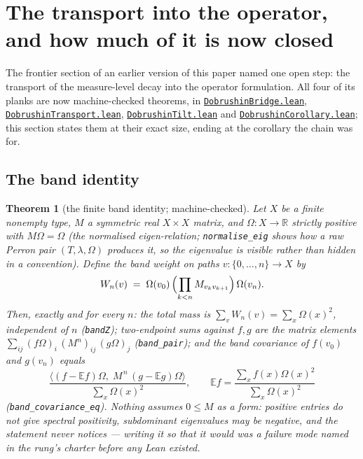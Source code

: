 \documentclass[11pt]{article}
\newtheorem{theorem}{Theorem}[section]
\theoremstyle{definition}
\newcommand{\anchor}{c7b870b05bd6d1bec270d499e1358a64070ce0e1}
\newcommand{\repofile}[2]{%
  \href{https://github.com/lluiseriksson/THE-ERIKSSON-PROGRAMME/blob/\anchor/#1}{\nolinkurl{#2}}}
\newcommand{\R}{\mathbb{R}}
\begin{document}
\section{The transport into the operator, and how much of it is now
closed}
\label{sec:transport}

The frontier section of an earlier version of this paper named one open
step: the transport of the measure-level decay into the operator
formulation.  All four of its planks are now machine-checked theorems, in
\repofile{YangMills/OS/DobrushinBridge.lean}{DobrushinBridge.lean},
\repofile{YangMills/OS/DobrushinTransport.lean}{DobrushinTransport.lean},
\repofile{YangMills/OS/DobrushinTilt.lean}{DobrushinTilt.lean} and
\repofile{YangMills/OS/DobrushinCorollary.lean}{DobrushinCorollary.lean};
this section states them at their exact size, ending at the corollary the
chain was for.

\subsection{The band identity}

\begin{theorem}[the finite band identity; machine-checked]
\label{thm:band}
Let $X$ be a finite nonempty type, $M$ a symmetric real $X\times X$ matrix,
and $\Omega:X\to\R$ strictly positive with $M\Omega=\Omega$ (the normalised
eigen-relation; \texttt{normalise\_eig} shows how a raw Perron pair
$(T,\lambda,\Omega)$ produces it, so the eigenvalue is visible rather than
hidden in a convention).  Define the band weight on paths
$v:\{0,\dots,n\}\to X$ by
\[
  W_n(v)\;=\;\Omega(v_0)\,\Bigl(\prod_{k<n} M_{v_k v_{k+1}}\Bigr)\,
  \Omega(v_n).
\]
Then, exactly and for every $n$: the total mass is
$\sum_v W_n(v)=\sum_x\Omega(x)^2$, \emph{independent of $n$}
(\texttt{bandZ}); two-endpoint sums against $f,g$ are the matrix elements
$\sum_{ij}(f\Omega)_i\,(M^n)_{ij}\,(g\Omega)_j$ (\texttt{band\_pair}); and
the band covariance of $f(v_0)$ and $g(v_n)$ equals
\[
  \frac{\bigl\langle (f-\mathbb{E} f)\Omega,\;M^{\,n}\,(g-\mathbb{E} g)\Omega
  \bigr\rangle}{\sum_x\Omega(x)^2},
  \qquad \mathbb{E} f=\frac{\sum_x f(x)\Omega(x)^2}{\sum_x\Omega(x)^2}
\]
(\texttt{band\_covariance\_eq}).  Nothing assumes $0\le M$ as a form:
positive \emph{entries} do not give spectral positivity, subdominant
eigenvalues may be negative, and the statement never notices --- writing it
so that it would was a failure mode named in the rung's charter before any
Lean existed.
\end{theorem}
\end{document}

